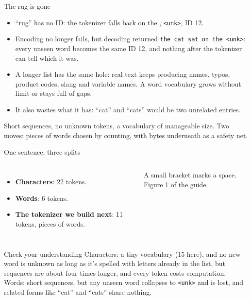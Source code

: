 \documentclass[aspectratio=169,11pt,t,\primeropts]{beamer}
\newcommand\tok[1]{\texttt{#1}}
\begin{document}
\begin{frame}{The rug is gone}
  \begin{itemize}
    \item ``rug'' has no ID: the tokenizer falls back on the , \tok{<unk>}, ID 12.
    \item Encoding no longer fails, but decoding returned \tok{the cat sat on the <unk>}: every
      unseen word becomes the same ID 12, and nothing after the tokenizer can tell which it was.
  \end{itemize}
  \pause
  \begin{itemize}
    \item A longer list has the same hole: real text keeps producing names, typos, product codes,
      slang and variable names. A word vocabulary grows without limit or stays full of gaps.
    \item It also wastes what it has: ``cat'' and ``cats'' would be two unrelated entries.
  \end{itemize}
  \pause
  \begin{keyidea}
    Short sequences, no unknown tokens, a vocabulary of manageable size. Two moves: pieces of
    words chosen by counting, with bytes underneath as a safety net.
  \end{keyidea}
\end{frame}

\begin{frame}{One sentence, three splits}
  \begin{columns}[c]
    \vspace{-3mm}
    \begin{itemize}
      \item \textbf{Characters}: 22 tokens.
      \item \textbf{Words}: 6 tokens.
      \item \textbf{The tokenizer we build next}: 11 tokens, pieces of words.
    \end{itemize}
    \vspace{2mm}
    {\footnotesize\color{primerMuted}A small bracket marks a space. Figure 1 of the guide.\par}
  \end{columns}
\end{frame}

\begin{frame}{Check your understanding}
  {Characters: a tiny vocabulary (15 here), and no new word is unknown as long as it's spelled
    with letters already in the list, but sequences are about
    four times longer, and every token costs computation. Words: short sequences, but any unseen
    word collapses to \tok{<unk>} and is lost, and related forms like ``cat'' and ``cats'' share
    nothing.}
\end{frame}
\end{document}
